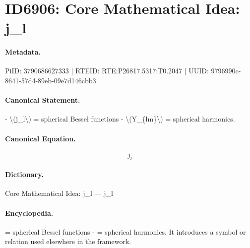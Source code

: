 \section*{ID6906: Core Mathematical Idea: j\_l}
\paragraph{Metadata.}
PiID: 3790686627333 | RTEID: RTE:P26817.5317:T0.2047 | UUID: 9796990c-8641-57d4-89eb-09e7d146cbb3

\paragraph{Canonical Statement.}
- \textbackslash{}(j\_l\textbackslash{}) = spherical Bessel functions - \textbackslash{}(Y\_\{lm\}\textbackslash{}) = spherical harmonics.

\paragraph{Canonical Equation.}
\[
j_l
\]

\paragraph{Dictionary.}
Core Mathematical Idea: j\_l — j\_l

\paragraph{Encyclopedia.}
= spherical Bessel functions - = spherical harmonics. It introduces a symbol or relation used elsewhere in the framework.
